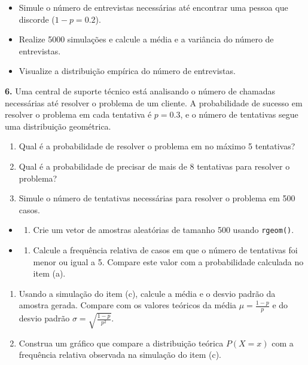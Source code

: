 \documentclass[
]{book}
\providecommand{\tightlist}{%
  \setlength{\itemsep}{0pt}\setlength{\parskip}{0pt}}
\begin{document}
\begin{itemize}
\tightlist
\item
  Simule o número de entrevistas necessárias até encontrar uma pessoa que discorde (\(1-p = 0.2\)).
\item
  Realize 5000 simulações e calcule a média e a variância do número de entrevistas.
\item
  Visualize a distribuição empírica do número de entrevistas.
\end{itemize}

\textbf{6.} Uma central de suporte técnico está analisando o número de chamadas necessárias até resolver o problema de um cliente. A probabilidade de sucesso em resolver o problema em cada tentativa é \(p = 0.3\), e o número de tentativas segue uma distribuição geométrica.

\begin{enumerate}
\def\labelenumi{(\alph{enumi})}
\item
  Qual é a probabilidade de resolver o problema em no máximo 5 tentativas?
\item
  Qual é a probabilidade de precisar de mais de 8 tentativas para resolver o problema?
\item
  Simule o número de tentativas necessárias para resolver o problema em 500 casos.
\end{enumerate}

\begin{itemize}
\tightlist
\item
  \begin{enumerate}
  \def\labelenumi{(\roman{enumi})}
  \tightlist
  \item
    Crie um vetor de amostras aleatórias de tamanho 500 usando \texttt{rgeom()}.
  \end{enumerate}
\item
  \begin{enumerate}
  \def\labelenumi{(\roman{enumi})}
  \setcounter{enumi}{1}
  \tightlist
  \item
    Calcule a frequência relativa de casos em que o número de tentativas foi menor ou igual a 5. Compare este valor com a probabilidade calculada no item (a).
  \end{enumerate}
\end{itemize}

\begin{enumerate}
\def\labelenumi{(\alph{enumi})}
\setcounter{enumi}{3}
\item
  Usando a simulação do item (c), calcule a média e o desvio padrão da amostra gerada. Compare com os valores teóricos da média \(\mu = \frac{1-p}{p}\) e do desvio padrão \(\sigma = \sqrt{\frac{1-p}{p^2}}\).
\item
  Construa um gráfico que compare a distribuição teórica \(P(X = x)\) com a frequência relativa observada na simulação do item (c).
\end{enumerate}
\end{document}
